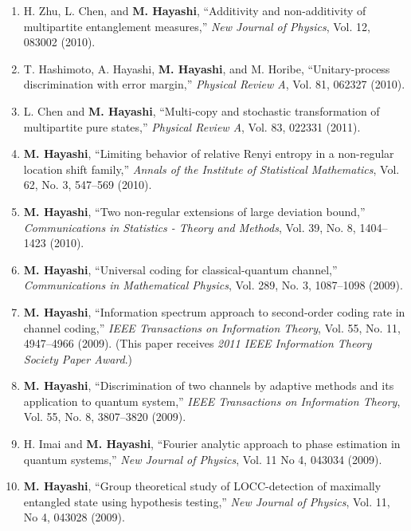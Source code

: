 \documentclass[a4paper,12pt,oneside]{article}
\begin{document}
\begin{enumerate}
\item   H. Zhu, L. Chen, and \textbf{M. Hayashi}, 
``Additivity and non-additivity of multipartite entanglement measures,'' 
{\em New Journal of Physics}, Vol. 12, 083002 (2010). 

\item   T. Hashimoto, A. Hayashi, \textbf{M. Hayashi}, and M. Horibe, 
``Unitary-process discrimination with error margin,'' 
{\em Physical Review A}, Vol. 81, 062327 (2010).

\item   L. Chen and \textbf{M. Hayashi}, 
``Multi-copy and stochastic transformation of multipartite pure states,'' 
{\em Physical Review A}, Vol. 83, 022331 (2011).

\item   \textbf{M. Hayashi}, 
``Limiting behavior of relative Renyi entropy in a non-regular location shift family,'' 
{\em Annals of the Institute of Statistical Mathematics}, Vol. 62, No. 3, 547--569 (2010).

\item   \textbf{M. Hayashi}, 
``Two non-regular extensions of large deviation bound,'' 
{\em Communications in Statistics - Theory and Methods}, 
Vol. 39, No. 8, 1404--1423 (2010). 

\item   \textbf{M. Hayashi}, 
``Universal coding for classical-quantum channel,'' 
{\em Communications in Mathematical Physics}, Vol. 289, No. 3, 1087--1098 (2009). 

\item   \textbf{M. Hayashi}, 
``Information spectrum approach to second-order coding rate in channel coding,'' 
{\em IEEE Transactions on Information Theory},
Vol. 55, No. 11, 4947--4966 (2009). 
(This paper receives {\em 2011 IEEE Information Theory Society Paper Award}.)

\item   \textbf{M. Hayashi}, 
``Discrimination of two channels by adaptive methods and its application to quantum system,'' 
{\em IEEE Transactions on Information Theory}, 
Vol. 55, No. 8, 3807--3820 (2009).

\item   H. Imai and \textbf{M. Hayashi}, 
``Fourier analytic approach to phase estimation in quantum systems,'' 
{\em New Journal of Physics}, Vol. 11 No 4, 043034 (2009). 

\item   \textbf{M. Hayashi}, 
``Group theoretical study of LOCC-detection of maximally entangled state using hypothesis testing,'' 
{\em New Journal of Physics}, Vol. 11, No 4, 043028 (2009).


\end{enumerate}
\end{document}
